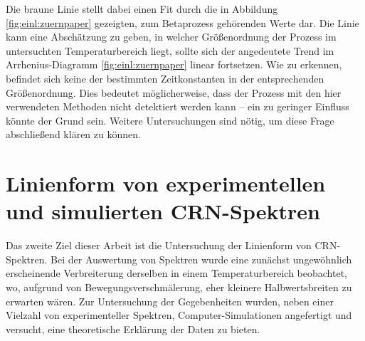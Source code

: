 Die braune Linie stellt dabei einen Fit durch die in Abbildung \ref{fig:einl:zuernpaper} gezeigten, zum Betaprozess gehörenden Werte dar. Die Linie kann eine Abschätzung zu geben, in welcher Größenordnung der Prozess im untersuchten Temperaturbereich liegt, sollte sich der angedeutete Trend im Arrhenius-Diagramm \ref{fig:einl:zuernpaper} linear fortsetzen. Wie zu erkennen, befindet sich keine der bestimmten Zeitkonstanten in der entsprechenden Größenordnung. Dies bedeutet möglicherweise, dass der Prozess mit den hier verwendeten Methoden nicht detektiert werden kann -- ein zu geringer Einfluss könnte der Grund sein. Weitere Untersuchungen sind nötig, um diese Frage abschließend klären zu können.



\section{Linienform von experimentellen und simulierten CRN-Spektren} \label{section:res:spektren}

Das zweite Ziel dieser Arbeit ist die Untersuchung der Linienform von CRN-Spek\-tren. Bei der Auswertung von Spektren wurde eine zunächst ungewöhnlich erscheinende Verbreiterung derselben in einem Temperaturbereich beobachtet, wo, aufgrund von Bewegungsverschmälerung, eher kleinere Halbwertsbreiten zu erwarten wären. Zur Untersuchung der Gegebenheiten wurden, neben einer Vielzahl von experimenteller Spektren, Computer-Simulationen angefertigt und versucht, eine theoretische Erklärung der Daten zu bieten.

